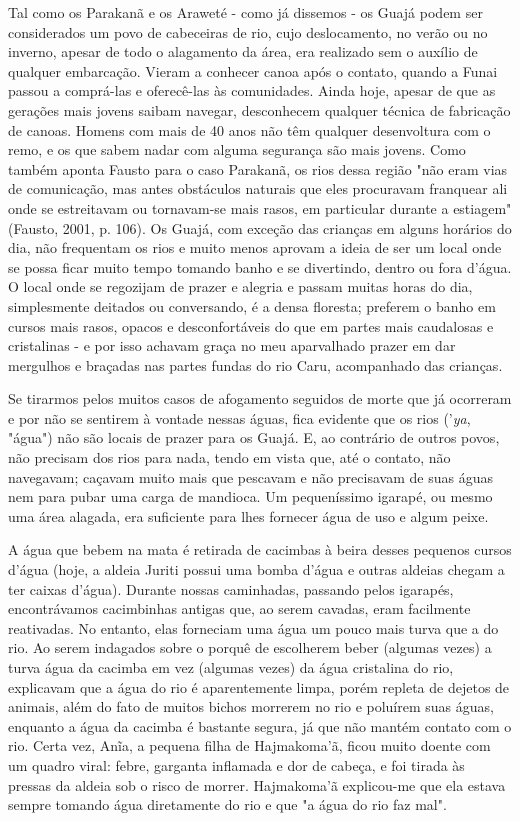 Tal como os Parakanã e os Araweté - como já dissemos - os Guajá podem
ser considerados um povo de cabeceiras de rio, cujo deslocamento, no
verão ou no inverno, apesar de todo o alagamento da área, era realizado
sem o auxílio de qualquer embarcação. Vieram a conhecer canoa após o
contato, quando a Funai passou a comprá-las e oferecê-las às
comunidades. Ainda hoje, apesar de que as gerações mais jovens saibam
navegar, desconhecem qualquer técnica de fabricação de canoas. Homens
com mais de 40 anos não têm qualquer desenvoltura com o remo, e os que
sabem nadar com alguma segurança são mais jovens. Como também aponta
Fausto para o caso Parakanã, os rios dessa região "não eram vias de
comunicação, mas antes obstáculos naturais que eles procuravam franquear
ali onde se estreitavam ou tornavam-se mais rasos, em particular durante
a estiagem" (Fausto, 2001, p. 106). Os Guajá, com exceção das crianças
em alguns horários do dia, não frequentam os rios e muito menos aprovam
a ideia de ser um local onde se possa ficar muito tempo tomando banho e
se divertindo, dentro ou fora d'água. O local onde se regozijam de
prazer e alegria e passam muitas horas do dia, simplesmente deitados ou
conversando, é a densa floresta; preferem o banho em cursos mais rasos,
opacos e desconfortáveis do que em partes mais caudalosas e cristalinas
- e por isso achavam graça no meu aparvalhado prazer em dar mergulhos e
braçadas nas partes fundas do rio Caru, acompanhado das crianças.

Se tirarmos pelos muitos casos de afogamento seguidos de morte que já
ocorreram e por não se sentirem à vontade nessas águas, fica evidente
que os rios ('\emph{ya}, "água") não são locais de prazer para os Guajá.
E, ao contrário de outros povos, não precisam dos rios para nada, tendo
em vista que, até o contato, não navegavam; caçavam muito mais que
pescavam e não precisavam de suas águas nem para pubar uma carga de
mandioca. Um pequeníssimo igarapé, ou mesmo uma área alagada, era
suficiente para lhes fornecer água de uso e algum peixe.

A água que bebem na mata é retirada de cacimbas à beira desses pequenos
cursos d'água (hoje, a aldeia Juriti possui uma bomba d'água e outras
aldeias chegam a ter caixas d'água). Durante nossas caminhadas, passando
pelos igarapés, encontrávamos cacimbinhas antigas que, ao serem cavadas,
eram facilmente reativadas. No entanto, elas forneciam uma água um pouco
mais turva que a do rio. Ao serem indagados sobre o porquê de escolherem
beber (algumas vezes) a turva água da cacimba em vez (algumas vezes) da
água cristalina do rio, explicavam que a água do rio é aparentemente
limpa, porém repleta de dejetos de animais, além do fato de muitos
bichos morrerem no rio e poluírem suas águas, enquanto a água da cacimba
é bastante segura, já que não mantém contato com o rio. Certa vez, Anĩa,
a pequena filha de Hajmakoma'ã, ficou muito doente com um quadro viral:
febre, garganta inflamada e dor de cabeça, e foi tirada às pressas da
aldeia sob o risco de morrer. Hajmakoma'ã explicou-me que ela estava
sempre tomando água diretamente do rio e que "a água do rio faz mal".

